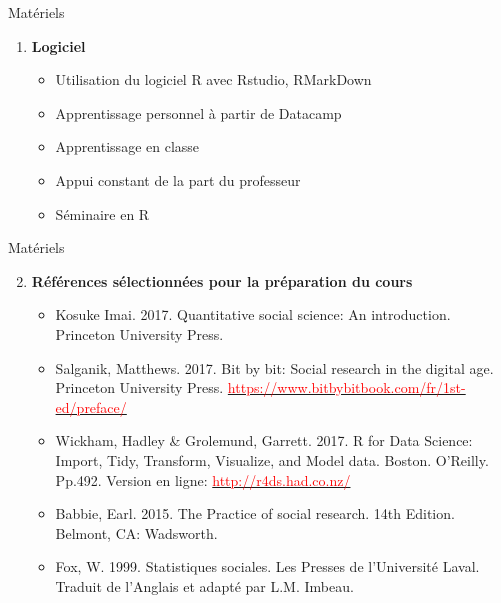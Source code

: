 \documentclass[xcolor=table]{beamer}
\begin{document}
\begin{frame}{Matériels}

\begin{enumerate}
\item \textbf{Logiciel}
	\begin{itemize}
	\item Utilisation du logiciel R avec Rstudio, RMarkDown
    \item Apprentissage personnel à partir de Datacamp
    \item Apprentissage en classe 
    \item Appui constant de la part du professeur
    \item Séminaire en R    
	\end{itemize}

\end{enumerate}
\end{frame}

\begin{frame}{Matériels}

\begin{enumerate}
\setcounter{enumi}{1}
\item \textbf{Références sélectionnées pour la préparation du cours}
\begin{itemize}
	\item Kosuke Imai. 2017. Quantitative social science: An introduction. Princeton University Press.
    \item Salganik, Matthews. 2017. Bit by bit: Social research in the digital age. Princeton University Press. \href{https://www.bitbybitbook.com/fr/1st-ed/preface/}{\textcolor{red}{https://www.bitbybitbook.com/fr/1st-ed/preface/}}
    \item Wickham, Hadley \& Grolemund, Garrett. 2017. R for Data Science: Import, Tidy, Transform, Visualize, and Model data. Boston. O’Reilly. Pp.492. Version en ligne: \href{http://r4ds.had.co.nz/}{\textcolor{red}{http://r4ds.had.co.nz/}}
    \item Babbie, Earl. 2015. The Practice of social research. 14th Edition. Belmont, CA: Wadsworth.
    \item Fox, W. 1999. Statistiques sociales. Les Presses de l’Université Laval. Traduit de l’Anglais et adapté par L.M. Imbeau.
\end{itemize}
\end{enumerate}
\end{frame}
\end{document}
